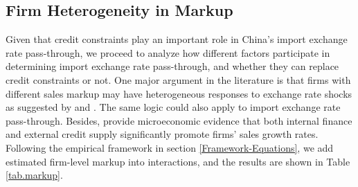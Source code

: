 \documentclass[12pt]{article}
\begin{document}
\subsection{Firm Heterogeneity in Markup}

Given that credit constraints play an important role in China's import exchange rate pass-through, we proceed to analyze how different factors participate in determining import exchange rate pass-through, and whether they can replace credit constraints or not. One major argument in the literature is that firms with different sales markup may have heterogeneous responses to exchange rate shocks as suggested by \cite{bmm2012} and \cite{lmx2015}. The same logic could also apply to import exchange rate pass-through. Besides, \cite{llz2018} provide microeconomic evidence that both internal finance and external credit supply significantly promote firms' sales growth rates. Following the empirical framework in section \ref{Framework-Equations}, we add estimated firm-level markup into interactions, and the results are shown in Table \ref{tab.markup}.
\end{document}
